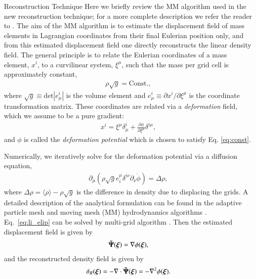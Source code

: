 \begin{section}{Reconstruction Technique}
  \label{sec:reconstruction}
  Here we briefly review the MM algorithm used in the new reconstruction technique; for a more
  complete description we refer the reader to \citealt{bib:ZhuH2016}.  
  The aim of the MM algorithm is to estimate the displacement field of mass elements in 
  Lagrangian coordinates from their final Eulerian position only, and from this
  estimated displacement field one directly reconstructs the linear density field. The
  general principle is to relate the Eulerian coordinates of a mass element, $x^i$, to
  a curvilinear system, $\xi^\mu$, such that the mass
  per grid cell is approximately constant,
  \begin{align}
   \label{eq:const}
    \rho \sqrt{g}=\mathrm{Const.},
  \end{align}
  where $\sqrt{g} \equiv \mathrm{det}\left| e^i_\mu\right|$ is the volume
  element and $e^i_\mu \equiv \partial x^i / \partial \xi ^ \mu$ is the coordinate transformation matrix. 
  These coordinates are
  related via a {\it deformation} field, which we assume to be a pure
  gradient:
  \begin{align}
    x^i = \xi^\mu \delta^i_\mu + \frac{\partial \phi}{\partial
    \xi^\mu}\delta^{i\mu},
  \end{align}
  and $\phi$ is called the {\it deformation potential} which is chosen to satisfy Eq. \ref{eq:const}.  

  Numerically, we iteratively solve for
  the deformation potential via a diffusion equation, 
  \begin{align}
    \label{eq:li_elip}
    \partial _\mu (\rho \sqrt{g} e^\mu _i \delta^{i\nu}
    \partial_\nu \dot{\phi})=\Delta \rho,
  \end{align}
  where $\Delta \rho = \langle\rho\rangle-\rho \sqrt{g}$ is the difference in density 
  due to displacing the grids. A detailed description 
  of the analytical formulation can be found in the adaptive
  particle mesh and moving mesh (MM) hydrodynamics algorithms \citep{bib:Pen1995,bib:Pen1998}.
  Eq.~\ref{eq:li_elip} can be solved by multi-grid
  algorithm \citep{bib:Pen1995,bib:Pen1998,bib:ZhuH2016}.
  Then the estimated displacement field is given by
  \begin{align}
   \label{eq:disp}
   \boldsymbol{\tilde{\Psi}}(\boldsymbol{\xi})=\nabla \phi(\boldsymbol{\xi}),
  \end{align}
  and the reconstructed density field is given by
  \begin{align}
   \label{eq:delta}
   \delta_R(\boldsymbol{\xi})=- \nabla \cdot \boldsymbol{\tilde{\Psi}}(\boldsymbol{\xi}) = - \nabla^2 \phi(\boldsymbol{\xi}). 
  \end{align}

\end{section}

